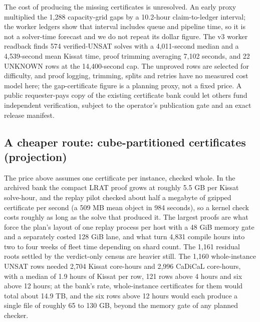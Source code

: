 \documentclass{anvil-paper}
\theoremstyle{definition}
\begin{document}
The cost of producing the missing certificates is unresolved. An early proxy multiplied the 1,288 capacity-grid gaps by a 10.2-hour claim-to-ledger interval; the worker ledgers show that interval includes queue and pipeline time, so it is not a solver-time forecast and we do not repeat its dollar figure. The v3 worker readback finds 574 verified-UNSAT solves with a 4,011-second median and a 4,539-second mean Kissat time, proof trimming averaging 7,102 seconds, and 22 UNKNOWN rows at the 14,400-second cap. The unproved rows are selected for difficulty, and proof logging, trimming, splits and retries have no measured cost model here; the gap-certificate figure is a planning proxy, not a fixed price. A public requester-pays copy of the existing certificate bank could let others fund independent verification, subject to the operator's publication gate and an exact release manifest.

\subsection{A cheaper route: cube-partitioned certificates (projection)}\label{sec:cube}

The price above assumes one certificate per instance, checked whole. In the archived bank the compact LRAT proof grows at roughly 5.5 GB per Kissat solve-hour, and the replay pilot checked about half a megabyte of gzipped certificate per second (a 509 MB mean object in 984 seconds), so a kernel check costs roughly as long as the solve that produced it. The largest proofs are what force the plan's layout of one replay process per host with a 48 GiB memory gate and a separately costed 128 GiB lane, and what turn 4,831 compile hours into two to four weeks of fleet time depending on shard count. The 1,161 residual roots settled by the verdict-only census are heavier still. The 1,160 whole-instance UNSAT rows needed 2,704 Kissat core-hours and 2,996 CaDiCaL core-hours, with a median of 1.9 hours of Kissat per row, 121 rows above 4 hours and six above 12 hours; at the bank's rate, whole-instance certificates for them would total about 14.9 TB, and the six rows above 12 hours would each produce a single file of roughly 65 to 130 GB, beyond the memory gate of any planned checker.
\end{document}
